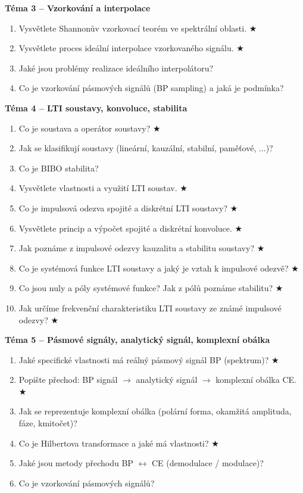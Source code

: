 \documentclass[12pt,a4paper]{article}
\begin{document}
\begin{tcolorbox}[colback=tmavemodr!5,colframe=tmavemodr!60,
    title={\bfseries\color{white} Kompletní seznam všech otázek ke zkoušce},
    fonttitle=\large, breakable]
\medskip
\textbf{\color{tmavemodr}Téma 3 – Vzorkování a interpolace}
\begin{enumerate}[resume, itemsep=2pt, label=\arabic*.]
  \item Vysvětlete Shannonův vzorkovací teorém ve spektrální oblasti. $\bigstar$
  \item Vysvětlete proces ideální interpolace vzorkovaného signálu. $\bigstar$
  \item Jaké jsou problémy realizace ideálního interpolátoru?
  \item Co je vzorkování pásmových signálů (BP sampling) a jaká je podmínka?
\end{enumerate}

\medskip
\textbf{\color{tmavemodr}Téma 4 – LTI soustavy, konvoluce, stabilita}
\begin{enumerate}[resume, itemsep=2pt, label=\arabic*.]
  \item Co je soustava a operátor soustavy? $\bigstar$
  \item Jak se klasifikují soustavy (lineární, kauzální, stabilní, paměťové, ...)?
  \item Co je BIBO stabilita?
  \item Vysvětlete vlastnosti a využití LTI soustav. $\bigstar$
  \item Co je impulsová odezva spojité a diskrétní LTI soustavy? $\bigstar$
  \item Vysvětlete princip a výpočet spojité a diskrétní konvoluce. $\bigstar$
  \item Jak poznáme z impulsové odezvy kauzalitu a stabilitu soustavy? $\bigstar$
  \item Co je systémová funkce LTI soustavy a jaký je vztah k impulsové odezvě? $\bigstar$
  \item Co jsou nuly a póly systémové funkce? Jak z pólů poznáme stabilitu? $\bigstar$
  \item Jak určíme frekvenční charakteristiku LTI soustavy ze známé impulsové odezvy? $\bigstar$
\end{enumerate}

\medskip
\textbf{\color{tmavemodr}Téma 5 – Pásmové signály, analytický signál, komplexní obálka}
\begin{enumerate}[resume, itemsep=2pt, label=\arabic*.]
  \item Jaké specifické vlastnosti má reálný pásmový signál BP (spektrum)? $\bigstar$
  \item Popište přechod: BP signál $\to$ analytický signál $\to$ komplexní obálka CE. $\bigstar$
  \item Jak se reprezentuje komplexní obálka (polární forma, okamžitá amplituda, fáze, kmitočet)?
  \item Co je Hilbertova transformace a jaké má vlastnosti? $\bigstar$
  \item Jaké jsou metody přechodu BP $\leftrightarrow$ CE (demodulace / modulace)?
  \item Co je vzorkování pásmových signálů?
\end{enumerate}


\end{tcolorbox}
\end{document}
